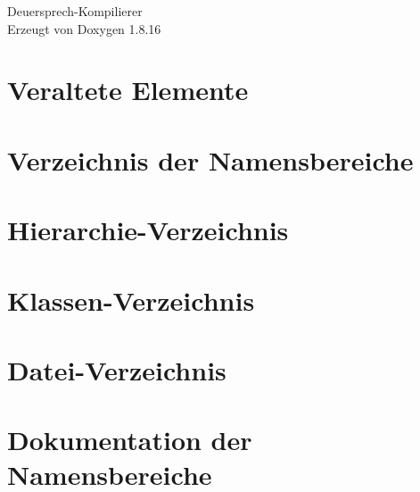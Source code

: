 \let\mypdfximage\pdfximage\def\pdfximage{\immediate\mypdfximage}\documentclass[twoside]{book}
\newcommand{\+}{\discretionary{\mbox{\scriptsize$\hookleftarrow$}}{}{}}
\newcommand{\clearemptydoublepage}{%
  \newpage{\pagestyle{empty}\cleardoublepage}%
}
\begin{document}
\hypersetup{pageanchor=false,
             bookmarksnumbered=true,
             pdfencoding=unicode
            }
\begin{titlepage}
\vspace*{7cm}
\begin{center}%
{\Large Deuersprech-\/\+Kompilierer }\\
\vspace*{1cm}
{\large Erzeugt von Doxygen 1.8.16}\\
\end{center}
\end{titlepage}
\clearemptydoublepage
{}
\tableofcontents
\clearemptydoublepage
{}
\hypersetup{pageanchor=true}

\chapter{Veraltete Elemente}
\label{deprecated}

\chapter{Verzeichnis der Namensbereiche}

\chapter{Hierarchie-\/\+Verzeichnis}

\chapter{Klassen-\/\+Verzeichnis}

\chapter{Datei-\/\+Verzeichnis}

\chapter{Dokumentation der Namensbereiche}

\end{document}
